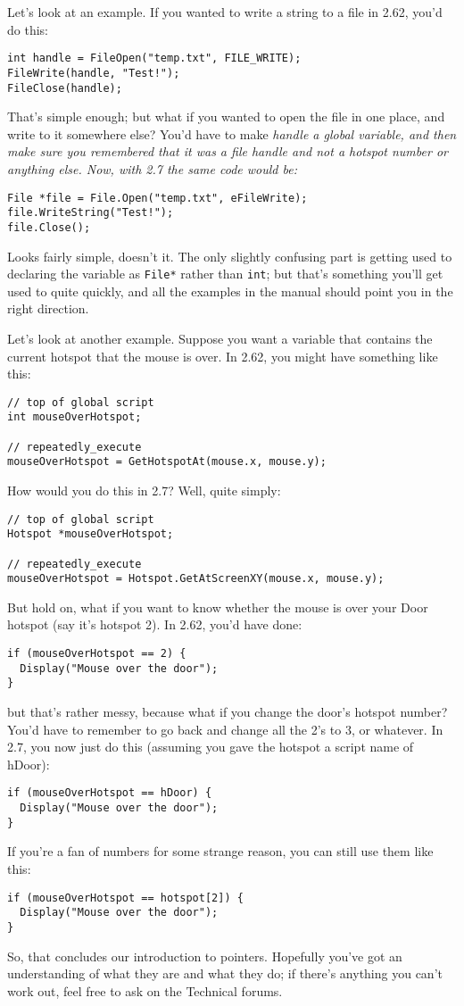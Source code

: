 Let's look at an example. If you wanted to write a string to a file in 2.62, you'd do this:
\begin{verbatim}
int handle = FileOpen("temp.txt", FILE_WRITE);
FileWrite(handle, "Test!");
FileClose(handle);
\end{verbatim}
That's simple enough; but what if you wanted to open the file in one place, and write
to it somewhere else? You'd have to make \it{handle} a global variable, and then make
sure you remembered that it was a file handle and not a hotspot number or anything else.
Now, with 2.7 the same code would be:
\begin{verbatim}
File *file = File.Open("temp.txt", eFileWrite);
file.WriteString("Test!");
file.Close();
\end{verbatim}
Looks fairly simple, doesn't it. The only slightly confusing part is getting used
to declaring the variable as \verb$File*$ rather than \verb$int$; but that's something
you'll get used to quite quickly, and all the examples in the manual should point
you in the right direction.

Let's look at another example. Suppose you want a variable that contains the current
hotspot that the mouse is over. In 2.62, you might have something like this:
\begin{verbatim}
// top of global script
int mouseOverHotspot;

// repeatedly_execute
mouseOverHotspot = GetHotspotAt(mouse.x, mouse.y);
\end{verbatim}
How would you do this in 2.7? Well, quite simply:
\begin{verbatim}
// top of global script
Hotspot *mouseOverHotspot;

// repeatedly_execute
mouseOverHotspot = Hotspot.GetAtScreenXY(mouse.x, mouse.y);
\end{verbatim}
But hold on, what if you want to know whether the mouse is over your Door hotspot (say
it's hotspot 2). In 2.62, you'd have done:
\begin{verbatim}
if (mouseOverHotspot == 2) {
  Display("Mouse over the door");
}
\end{verbatim}
but that's rather messy, because what if you change the door's hotspot number? You'd
have to remember to go back and change all the 2's to 3, or whatever. In 2.7, you now just
do this (assuming you gave the hotspot a script name of hDoor):
\begin{verbatim}
if (mouseOverHotspot == hDoor) {
  Display("Mouse over the door");
}
\end{verbatim}
If you're a fan of numbers for some strange reason, you can still use them like this:
\begin{verbatim}
if (mouseOverHotspot == hotspot[2]) {
  Display("Mouse over the door");
}
\end{verbatim}
So, that concludes our introduction to pointers. Hopefully you've got an understanding of
what they are and what they do; if there's anything you can't work out, feel free to ask
on the Technical forums.


